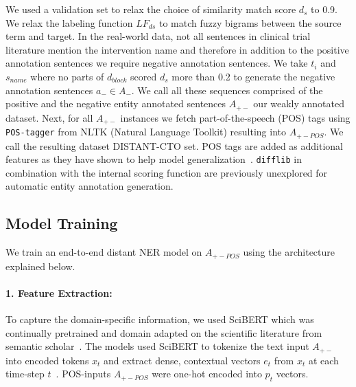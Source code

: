 \documentclass[11pt]{article}
\begin{document}
We used a validation set to relax the choice of similarity match score $d_s$ to 0.9.
We relax the labeling function $LF_{ds}$ to match fuzzy bigrams between the source term and target.
In the real-world data, not all sentences in clinical trial literature mention the intervention name and therefore in addition to the positive annotation sentences we require negative annotation sentences.
We take $t_i$ and $s_{name}$ where no parts of $d_{block}$ scored $d_s$ more than 0.2 to generate the negative annotation sentences $a_{-} \in A_{-}$.
We call all these sequences comprised of the positive and the negative entity annotated sentences $A_{+-}$ our weakly annotated dataset.
Next, for all $A_{+-}$ instances we fetch part-of-the-speech (POS) tags using {\tt POS-tagger} from NLTK (Natural Language Toolkit) resulting into $A_{+-POS}$.
We call the resulting dataset DISTANT-CTO set.
POS tags are added as additional features as they have shown to help model generalization~\cite{augenstein2017generalisation}.
{\tt difflib} in combination with the internal scoring function are previously unexplored for automatic entity annotation generation.
%
%
%
\subsection{Model Training}
\label{subsec:training}
%
We train an end-to-end distant NER model on $A_{+-POS}$ using the architecture explained below.
%
\paragraph{1. Feature Extraction:}
%
To capture the domain-specific information, we used SciBERT which was continually pretrained and domain adapted on the scientific literature from semantic scholar~\cite{gururangan2020don}.
The models used SciBERT to tokenize the text input $A_{+-}$ into encoded tokens $x_{t}$ and extract dense, contextual vectors $e_{t}$ from $x_{t}$ at each time-step $t$~\cite{beltagy2019scibert}.
POS-inputs $A_{+-POS}$ were one-hot encoded into $p_{t}$ vectors.
%
\end{document}
